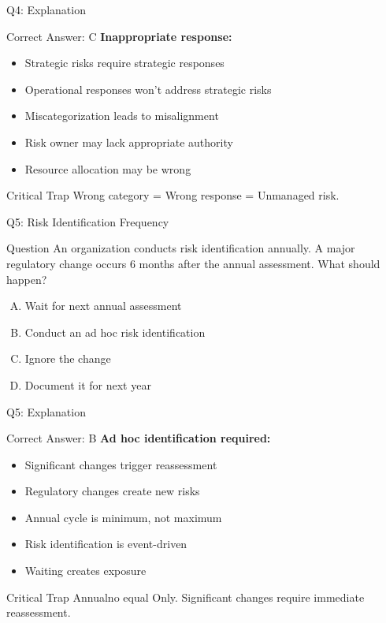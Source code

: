 \documentclass{beamer}
\begin{document}
	\begin{frame}{Q4: Explanation}
		\begin{block}{Correct Answer: C}
			\textbf{Inappropriate response:}
			\begin{itemize}
				\item Strategic risks require strategic responses
				\item Operational responses won't address strategic risks
				\item Miscategorization leads to misalignment
				\item Risk owner may lack appropriate authority
				\item Resource allocation may be wrong
			\end{itemize}
		\end{block}
		\begin{alertblock}{Critical Trap}
			Wrong category = Wrong response = Unmanaged risk.
		\end{alertblock}
	\end{frame}
	
	\begin{frame}{Q5: Risk Identification Frequency}
		\begin{block}{Question}
			An organization conducts risk identification annually. A major regulatory change occurs 6 months after the annual assessment. What should happen?
		\end{block}
		\begin{enumerate}[(A)]
			\item Wait for next annual assessment
			\item Conduct an ad hoc risk identification
			\item Ignore the change
			\item Document it for next year
		\end{enumerate}
	\end{frame}
	
	\begin{frame}{Q5: Explanation}
		\begin{block}{Correct Answer: B}
			\textbf{Ad hoc identification required:}
			\begin{itemize}
				\item Significant changes trigger reassessment
				\item Regulatory changes create new risks
				\item Annual cycle is minimum, not maximum
				\item Risk identification is event-driven
				\item Waiting creates exposure
			\end{itemize}
		\end{block}
		\begin{alertblock}{Critical Trap}
			Annualno equal Only. Significant changes require immediate reassessment.
		\end{alertblock}
	\end{frame}
	
\end{document}
